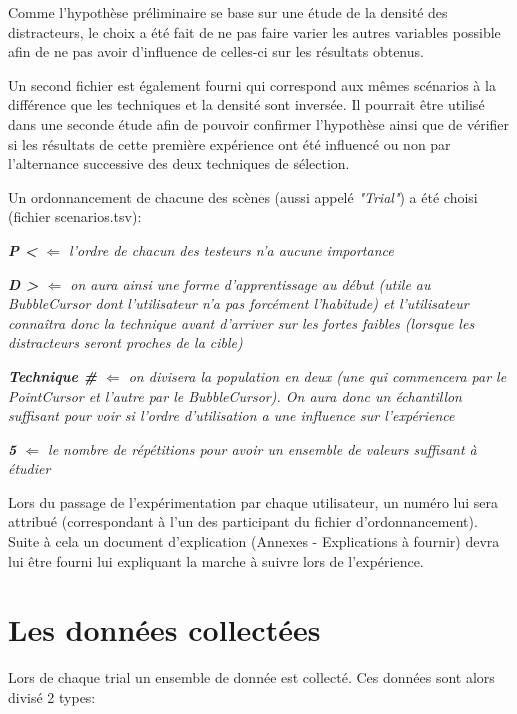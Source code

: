 \documentclass[a4paper, 12pt]{article}
\begin{document}
Comme l'hypothèse préliminaire se base sur une étude de la densité des distracteurs, le choix a été fait de ne pas faire varier les autres variables possible afin de ne pas avoir d'influence de celles-ci sur les résultats obtenus.

Un second fichier est également fourni qui correspond aux mêmes scénarios à la différence que les techniques et la densité sont inversée. Il pourrait être utilisé dans une seconde étude afin de pouvoir confirmer l'hypothèse ainsi que de vérifier si les résultats de cette première expérience ont été influencé ou non par l'alternance successive des deux techniques de sélection.

\pagebreak

Un ordonnancement de chacune des scènes (aussi appelé \textit{"Trial"}) a été choisi (fichier scenarios.tsv):

\textit{\textbf{P <} $\Leftarrow$ l'ordre de chacun des testeurs n'a aucune importance}

\setlength{\parindent}{.5cm}
\indent \textit{\textbf{D >} $\Leftarrow$ on aura ainsi une forme d'apprentissage au début (utile au BubbleCursor dont l'utilisateur n'a pas forcément l'habitude) et l'utilisateur connaîtra donc la technique avant d'arriver sur les fortes faibles (lorsque les distracteurs seront proches de la cible)}

\indent \indent \textit{\textbf{Technique \#} $\Leftarrow$ on divisera la population en deux (une qui commencera par le PointCursor et l'autre par le BubbleCursor). On aura donc un échantillon suffisant pour voir si l'ordre d'utilisation a une influence sur l'expérience}

\indent \indent \indent \textit{\textbf{5} $\Leftarrow$ le nombre de répétitions pour avoir un ensemble de valeurs suffisant à étudier}
\setlength{\parindent}{0cm}

Lors du passage de l'expérimentation par chaque utilisateur, un numéro lui sera attribué (correspondant à l'un des participant du fichier d'ordonnancement). Suite à cela un document d'explication (Annexes - Explications à fournir) devra lui être fourni lui expliquant la marche à suivre lors de l'expérience.

\pagebreak
\section{Les données collectées}

Lors de chaque trial un ensemble de donnée est collecté. Ces données sont alors divisé 2 types:
\end{document}
